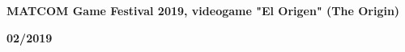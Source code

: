 \documentclass{article}
\begin{document}
\begin{minipage}{0.8\textwidth}
    \parbox{0.8\linewidth}{\textbf{MATCOM Game Festival 2019, videogame "El Origen" (The Origin)
    }} \hfill \textbf{02/2019}\\
    \\
\end{minipage}

\begin{minipage}{0.8\textwidth}
    \parbox{0.8\linewidth}{\textbf{}} \hfill \textbf{}\\
    \\
\end{minipage} \hfill \qrcode[height=0.6in]{}\\
\begin{minipage}{0.8\textwidth}
    \parbox{0.8\linewidth}{\textbf{}} \hfill \textbf{}\\
    \\
\end{minipage} \hfill \qrcode[height=0.6in]{}\\
\begin{minipage}{0.8\textwidth}
    \parbox{0.8\linewidth}{\textbf{}} \hfill \textbf{}\\
    \\
\end{minipage} \hfill \qrcode[height=0.6in]{}\\
\begin{minipage}{0.8\textwidth}
    \parbox{0.8\linewidth}{\textbf{}} \hfill \textbf{}\\
    \\
\end{minipage} \hfill \qrcode[height=0.6in]{}\\
\begin{minipage}{0.8\textwidth}
    \parbox{0.8\linewidth}{\textbf{}} \hfill \textbf{}\\
    \\
\end{minipage} \hfill \qrcode[height=0.6in]{}\\
\begin{minipage}{0.8\textwidth}
    \parbox{0.8\linewidth}{\textbf{}} \hfill \textbf{}\\
    \\
\end{minipage} \hfill \qrcode[height=0.6in]{}\\
\begin{minipage}{0.8\textwidth}
    \parbox{0.8\linewidth}{\textbf{}} \hfill \textbf{}\\
    \\
\end{minipage} \hfill \qrcode[height=0.6in]{}\\
\end{document}
